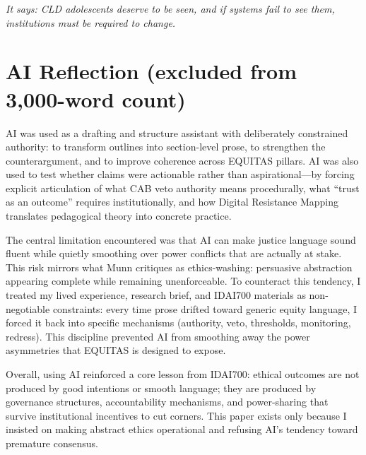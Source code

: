 \documentclass[12pt,a4paper]{article}
\begin{document}
\textit{It says: CLD adolescents deserve to be seen, and if systems fail to see them, institutions must be required to change.}\cite{garcia_ed415}

\section*{AI Reflection (excluded from 3,000-word count)}

AI was used as a drafting and structure assistant with deliberately constrained authority: to transform outlines into section-level prose, to strengthen the counterargument, and to improve coherence across EQUITAS pillars. AI was also used to test whether claims were actionable rather than aspirational—by forcing explicit articulation of what CAB veto authority means procedurally, what ``trust as an outcome'' requires institutionally, and how Digital Resistance Mapping translates pedagogical theory into concrete practice.\cite{garcia_ed415}

The central limitation encountered was that AI can make justice language sound fluent while quietly smoothing over power conflicts that are actually at stake. This risk mirrors what Munn critiques as ethics-washing: persuasive abstraction appearing complete while remaining unenforceable.\cite{munn_idai700} To counteract this tendency, I treated my lived experience, research brief, and IDAI700 materials as non-negotiable constraints: every time prose drifted toward generic equity language, I forced it back into specific mechanisms (authority, veto, thresholds, monitoring, redress). This discipline prevented AI from smoothing away the power asymmetries that EQUITAS is designed to expose.\cite{garcia_ed415}

Overall, using AI reinforced a core lesson from IDAI700: ethical outcomes are not produced by good intentions or smooth language; they are produced by governance structures, accountability mechanisms, and power-sharing that survive institutional incentives to cut corners.\cite{munn_idai700} This paper exists only because I insisted on making abstract ethics operational and refusing AI's tendency toward premature consensus.
\end{document}

